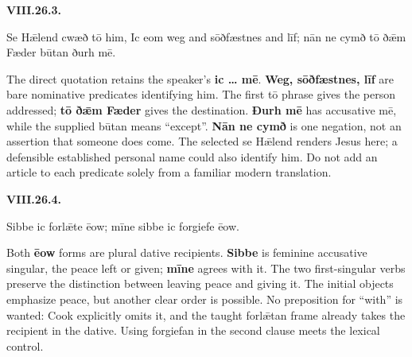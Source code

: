 \par\begin{minipage}{\linewidth}\raggedright
\textbf{VIII.26.3.}

Se Hǣlend cwæð tō him, Ic eom weg and sōðfæstnes and līf; nān ne cymð tō ðǣm Fæder būtan ðurh mē.

The direct quotation retains the speaker's \textbf{ic … mē}. \textbf{Weg, sōðfæstnes, līf} are bare nominative predicates identifying him. The first tō phrase gives the person addressed; \textbf{tō ðǣm Fæder} gives the destination. \textbf{Ðurh mē} has accusative mē, while the supplied būtan means “except”. \textbf{Nān ne cymð} is one negation, not an assertion that someone does come. The selected se Hǣlend renders Jesus here; a defensible established personal name could also identify him. Do not add an article to each predicate solely from a familiar modern translation.

\end{minipage}\par\addvspace{4pt}

\par\begin{minipage}{\linewidth}\raggedright
\textbf{VIII.26.4.}

Sibbe ic forlǣte ēow; mīne sibbe ic forgiefe ēow.

Both \textbf{ēow} forms are plural dative recipients. \textbf{Sibbe} is feminine accusative singular, the peace left or given; \textbf{mīne} agrees with it. The two first-singular verbs preserve the distinction between leaving peace and giving it. The initial objects emphasize peace, but another clear order is possible. No preposition for “with” is wanted: Cook explicitly omits it, and the taught forlǣtan frame already takes the recipient in the dative. Using forgiefan in the second clause meets the lexical control.

\end{minipage}\par\addvspace{4pt}

